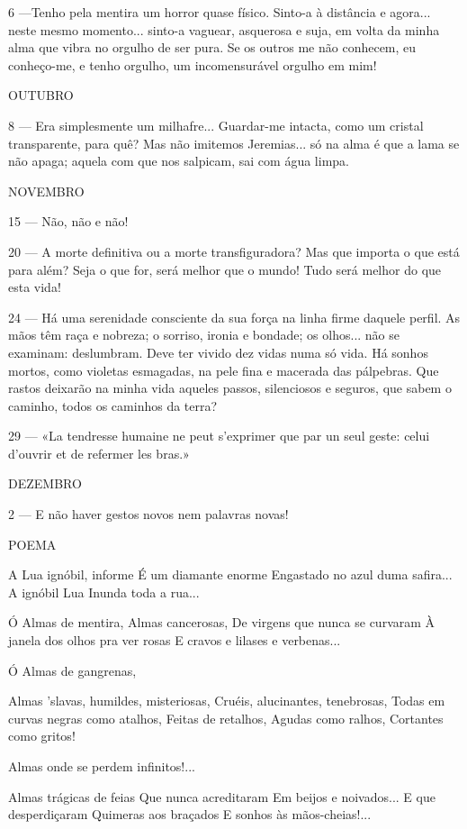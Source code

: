 6 —Tenho pela mentira um horror quase físico. 
Sinto-a à distância e agora... neste mesmo momento...
sinto-a vaguear, asquerosa e suja, em volta da minha
alma que vibra no orgulho de ser pura. Se os outros
me não conhecem, eu conheço-me, e tenho orgulho,
um incomensurável orgulho em mim!

OUTUBRO

8 — Era simplesmente um milhafre... Guardar-me
intacta, como um cristal transparente, para quê? Mas
não imitemos Jeremias... só na alma é que a lama se
não apaga; aquela com que nos salpicam, sai com água
limpa.

NOVEMBRO

15 — Não, não e não!

20 — A morte definitiva ou a morte transfiguradora?
Mas que importa o que está para além?
Seja o que for, será melhor que o mundo!
Tudo será melhor do que esta vida!

24 — Há uma serenidade consciente da sua força na
linha firme daquele perfil. As mãos têm raça e
nobreza; o sorriso, ironia e bondade; os olhos...
não se examinam: deslumbram. Deve ter vivido dez
vidas numa só vida. Há sonhos mortos, como 
violetas esmagadas, na pele fina e macerada das 
pálpebras. Que rastos deixarão na minha vida aqueles
passos, silenciosos e seguros, que sabem o caminho,
todos os caminhos da terra?

29 — «La tendresse humaine ne peut s’exprimer que
par un seul geste: celui d’ouvrir et de refermer les
bras.»

DEZEMBRO

2 — E não haver gestos novos nem palavras novas!


POEMA


A Lua ignóbil, informe
É um diamante enorme
Engastado no azul duma safira...
A ignóbil Lua
Inunda toda a rua...

Ó Almas de mentira,
Almas cancerosas,
De virgens que nunca se curvaram
À janela dos olhos pra ver rosas
E cravos e lilases e verbenas...

Ó Almas de gangrenas,

Almas ’slavas, humildes, misteriosas,
Cruéis, alucinantes, tenebrosas,
Todas em curvas negras como atalhos,
Feitas de retalhos,
Agudas como ralhos,
Cortantes como gritos!

Almas onde se perdem infinitos!...

Almas trágicas de feias
Que nunca acreditaram
Em beijos e noivados...
E que desperdiçaram
Quimeras aos braçados
E sonhos às mãos-cheias!...

